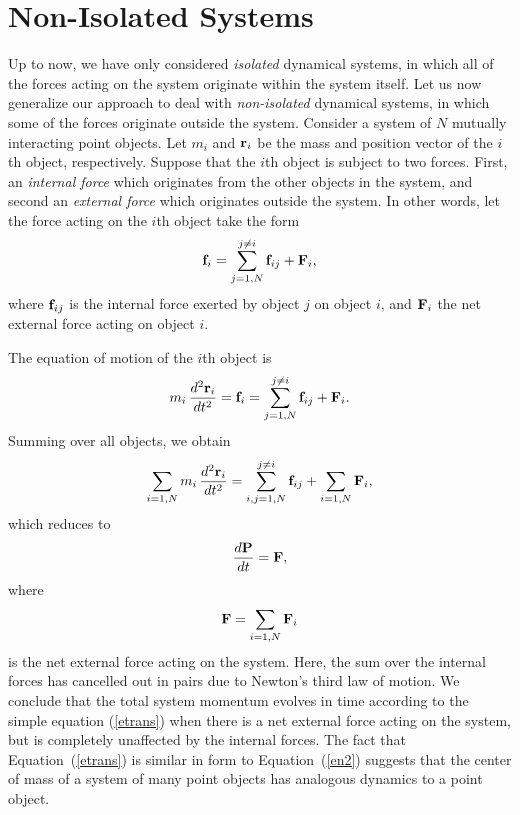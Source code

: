 \section{Non-Isolated Systems}\label{new4}
Up to now, we have only considered {\em isolated}\/ dynamical systems, in which all of the forces acting
on the system originate  within the system itself. Let us now generalize our approach to
deal with {\em non-isolated}\/ dynamical systems, in which some of the forces  originate outside the system. Consider a system of $N$ mutually interacting point objects. Let
$m_i$ and ${\bf r}_i$ be the mass and position vector of the $i$th object, respectively. Suppose
that the $i$th object is subject to two forces. First, an {\em internal force}\/ which originates
from the other objects in the system, and second an {\em external force}\/ which originates
outside the system. In other words, let the force acting on the $i$th object take the form
\begin{equation}
{\bf f}_i = \sum_{j=1,N}^{j\neq i} {\bf f}_{ij} + {\bf F}_i,
\end{equation}
where ${\bf f}_{ij}$ is the internal force exerted by object $j$ on object $i$, and ${\bf F}_i$  the
net external force acting on object $i$. 

The equation of motion of the $i$th object is
\begin{equation}\label{eemon}
m_i\,\frac{d^2{\bf r}_i}{dt^2} = {\bf f}_i =  \sum_{j=1,N}^{j\neq i} {\bf f}_{ij} + {\bf F}_i.
\end{equation}
Summing over all objects, we obtain
\begin{equation}
\sum_{i=1,N} m_i\,\frac{d^2{\bf r}_i}{dt^2} =  \sum_{i,j=1,N}^{j\neq i} {\bf f}_{ij} + \sum_{i=1,N}{\bf F}_i,
\end{equation}
which reduces to
\begin{equation}\label{etrans}
\frac{d{\bf P}}{dt} = {\bf F},
\end{equation}
where
\begin{equation}
{\bf F} = \sum_{i=1,N} {\bf F}_i
\end{equation}
is the net external force acting on the system. Here, the sum over the internal forces has cancelled out in pairs
due to Newton's third law of motion. We conclude that the total system momentum  evolves in time according to the
simple equation (\ref{etrans})
when there is a net external force acting on the system, but is completely unaffected by the internal forces.
The fact that Equation~(\ref{etrans}) is similar in form to Equation~(\ref{en2}) suggests that the center of
mass of a system of many point objects has analogous dynamics to a point object.

